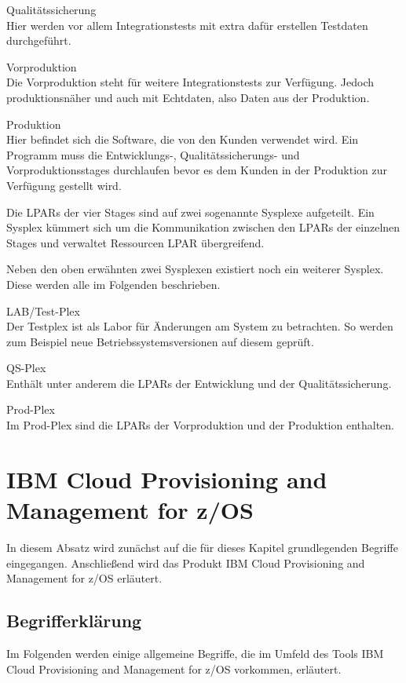 \glqq Qualitätssicherung\grqq\\
Hier werden vor allem Integrationstests mit extra dafür erstellen Testdaten durchgeführt.

\glqq Vorproduktion\grqq\\
Die Vorproduktion steht für weitere Integrationstests zur Verfügung.
Jedoch produktionsnäher und auch mit Echtdaten, also Daten aus der Produktion.

\glqq Produktion\grqq\\
Hier befindet sich die Software, die von den Kunden verwendet wird.
Ein Programm muss die Entwicklungs-, Qualitätssicherungs- und Vorproduktionsstages durchlaufen bevor es dem Kunden in der Produktion zur Verfügung gestellt wird.

Die LPARs der vier Stages sind auf zwei sogenannte  \glqq Sysplexe\grqq{} aufgeteilt.
Ein Sysplex kümmert sich um die Kommunikation zwischen den LPARs der einzelnen Stages und verwaltet Ressourcen LPAR übergreifend.
\cite{Kyne.2016}

Neben den oben erwähnten zwei Sysplexen existiert noch ein weiterer Sysplex.
Diese werden alle im Folgenden beschrieben.

\glqq LAB/Test-Plex\grqq\\
Der Testplex ist als Labor für Änderungen am System zu betrachten.
So werden zum Beispiel neue Betriebssystemsversionen auf diesem geprüft.

\glqq QS-Plex\grqq\\
Enthält unter anderem die LPARs der Entwicklung und der Qualitätssicherung.

\glqq Prod-Plex\grqq\\
Im Prod-Plex sind die LPARs der Vorproduktion und der Produktion enthalten.

\section{IBM Cloud Provisioning and Management for z/OS}\label{sec:zosmf}
In diesem Absatz wird zunächst auf die für dieses Kapitel grundlegenden Begriffe eingegangen.
Anschließend wird das Produkt \glqq IBM Cloud Provisioning and Management for z/OS\grqq{} erläutert.

\subsection{Begrifferklärung}
Im Folgenden werden einige allgemeine Begriffe, die im Umfeld des Tools \glqq IBM Cloud Provisioning and Management for z/OS\grqq{} vorkommen, erläutert.

